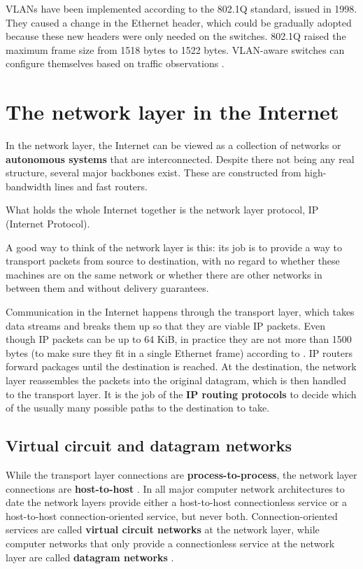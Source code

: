 \documentclass[12pt, oneside]{book}
\begin{document}
VLANs have been implemented according to the 802.1Q standard, issued in 1998. They caused a change in the Ethernet header, which could be gradually adopted because these new headers were only needed on the switches. 802.1Q raised the maximum frame size from 1518 bytes to 1522 bytes. VLAN-aware switches can configure themselves based on traffic observations \cite[p.~348]{computer-networks-tanenbaum-2012}.

\section{The network layer in the Internet}

In the network layer, the Internet can be viewed as a collection of networks or \textbf{autonomous systems} that are interconnected. Despite there not being any real structure, several major backbones exist. These are constructed from high-bandwidth lines and fast routers.

What holds the whole Internet together is the network layer protocol, IP (Internet Protocol).

A good way to think of the network layer is this: its job is to provide a way to transport packets from source to destination, with no regard to whether these machines are on the same network or whether there are other networks in between them and without delivery guarantees. \cite{computer-networks-tanenbaum-2012}

Communication in the Internet happens through the transport layer, which takes data streams and breaks them up so that they are viable IP packets. Even though IP packets can be up to 64 KiB, in practice they are not more than 1500 bytes (to make sure they fit in a single Ethernet frame) according to \cite{computer-networks-tanenbaum-2012}.
IP routers forward packages until the destination is reached. At the destination, the network layer reassembles the packets into the original datagram, which is then handled to the transport layer.
It is the job of the \textbf{IP routing protocols} to decide which of the usually many possible paths to the destination to take.

\subsection{Virtual circuit and datagram networks}

While the transport layer connections are \textbf{process-to-process}, the network layer connections are \textbf{host-to-host} \cite[p.~313]{computer-networking-kurose-2012}.
In all major computer network architectures to date the network layers provide either a host-to-host connectionless service or a host-to-host connection-oriented service, but never both. Connection-oriented services are called \textbf{virtual circuit networks} at the network layer, while computer networks that only provide a connectionless service at the network layer are called \textbf{datagram networks} \cite[p.~313]{computer-networking-kurose-2012}.
\end{document}
